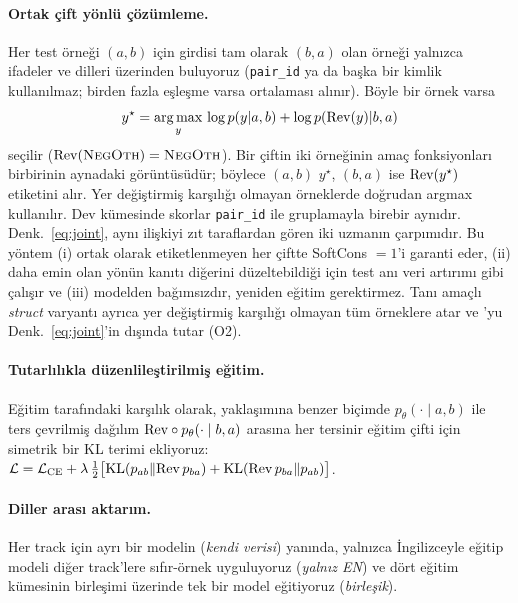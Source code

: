\paragraph{Ortak çift yönlü çözümleme.} Her test örneği $(a,b)$ için girdisi tam olarak $(b,a)$ olan örneği yalnızca ifadeler ve dilleri üzerinden buluyoruz (\texttt{pair\_id} ya da başka bir kimlik kullanılmaz; birden fazla eşleşme varsa ortalaması alınır). Böyle bir örnek varsa
\begin{equation}
y^\star = \operatorname*{arg\,max}_{y}\, \log p(y|a,b) + \log p(\mathrm{Rev}(y)|b,a)
\label{eq:joint}
\end{equation}
seçilir ($\mathrm{Rev}(\textsc{NegOth})=\textsc{NegOth}$). Bir çiftin iki örneğinin amaç fonksiyonları birbirinin aynadaki görüntüsüdür; böylece $(a,b)$ $y^\star$, $(b,a)$ ise $\mathrm{Rev}(y^\star)$ etiketini alır. Yer değiştirmiş karşılığı olmayan örneklerde doğrudan argmax kullanılır. Dev kümesinde skorlar \texttt{pair\_id} ile gruplamayla birebir aynıdır. Denk.~\ref{eq:joint}, aynı ilişkiyi zıt taraflardan gören iki uzmanın çarpımıdır. Bu yöntem (i) ortak olarak \NO etiketlenmeyen her çiftte SoftCons $=1$'i garanti eder, (ii) daha emin olan yönün kanıtı diğerini düzeltebildiği için test anı veri artırımı gibi çalışır ve (iii) modelden bağımsızdır, yeniden eğitim gerektirmez. Tanı amaçlı \textit{struct} varyantı ayrıca yer değiştirmiş karşılığı olmayan tüm örneklere \NO atar ve \NO'yu Denk.~\ref{eq:joint}'in dışında tutar (O2).

\paragraph{Tutarlılıkla düzenlileştirilmiş eğitim.} Eğitim tarafındaki karşılık olarak, \citet{li2019logic} yaklaşımına benzer biçimde $p_\theta(\cdot\mid a,b)$ ile ters çevrilmiş dağılım $\mathrm{Rev}\circ p_\theta(\cdot\mid b,a)$ arasına her tersinir eğitim çifti için simetrik bir KL terimi ekliyoruz: $\mathcal{L} = \mathcal{L}_{\text{CE}} + \lambda\,\tfrac{1}{2}\big[\mathrm{KL}(p_{ab}\Vert \mathrm{Rev}\,p_{ba}) + \mathrm{KL}(\mathrm{Rev}\,p_{ba}\Vert p_{ab})\big]$.

\paragraph{Diller arası aktarım.} Her track için ayrı bir modelin (\emph{kendi verisi}) yanında, yalnızca İngilizceyle eğitip modeli diğer track'lere sıfır-örnek uyguluyoruz (\emph{yalnız EN}) ve dört eğitim kümesinin birleşimi üzerinde tek bir model eğitiyoruz (\emph{birleşik}).

